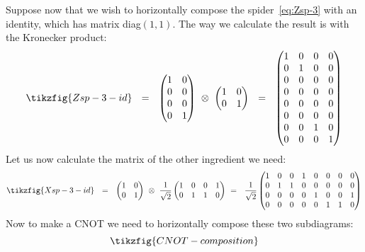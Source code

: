 \documentclass[a4paper,onecolumn,superscriptaddress,11pt,%
				unpublished,%
				allowfontchageintitle,%
				]{quantumarticle}
\begin{document}
Suppose now that we wish to horizontally compose the spider~\eqref{eq:Zsp-3} with an identity, which has matrix diag$(1,1)$. The way we calculate the result is with the Kronecker product:
\[\tikzfig{Zsp-3-id}\ \ = \ \ \begin{pmatrix}1&0\\0&0\\0&0\\0&1\end{pmatrix}\ \otimes\ \begin{pmatrix}1&0\\0&1\end{pmatrix} \ \ 
= \ \ \begin{pmatrix}1&0&0&0\\0&1&0&0\\0&0&0&0\\0&0&0&0\\0&0&0&0\\0&0&0&0\\0&0&1&0\\0&0&0&1\end{pmatrix}\]
Let us now calculate the matrix of the other ingredient we need:
\[\tikzfig{Xsp-3-id}\ \ = \ \ \begin{pmatrix}1&0\\0&1\end{pmatrix}\ \otimes\ \frac{1}{\sqrt{2}}\begin{pmatrix}1&0&0&1\\0&1&1&0\end{pmatrix} \ 
= \ \ \frac{1}{\sqrt{2}}\begin{pmatrix}1&0&0&1&0&0&0&0\\0&1&1&0&0&0&0&0\\0&0&0&0&1&0&0&1\\0&0&0&0&0&1&1&0\end{pmatrix}\]
Now to make a CNOT we need to horizontally compose these two subdiagrams:
\begin{equation}\label{eq:CNOT-composition}
\tikzfig{CNOT-composition}
\end{equation}
\end{document}
